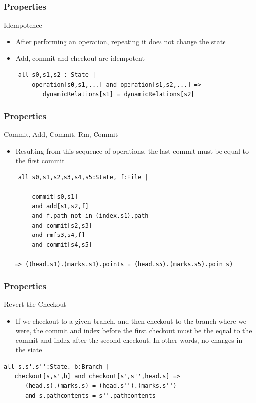 \documentclass{beamer}
\begin{document}
\begin{frame}[fragile]
   \frametitle{Properties}
   \begin{block}{Idempotence}
      \begin{itemize}
         \item After performing an operation, repeating it does not change the state
         \item Add, commit and checkout are idempotent
      \end{itemize}
   \end{block}
   \scriptsize
   \begin{lstlisting}
	all s0,s1,s2 : State | 
		operation[s0,s1,...] and operation[s1,s2,...] => 
		   dynamicRelations[s1] = dynamicRelations[s2]
   \end{lstlisting}
\end{frame}

\begin{frame}[fragile]
	\frametitle{Properties}
	\begin{block}{Commit, Add, Commit, Rm, Commit}
	\begin{itemize}
		\item Resulting from this sequence of operations, the last
		commit must be equal to the first commit
	\end{itemize}
	\end{block}
	\scriptsize
	\begin{lstlisting}
	all s0,s1,s2,s3,s4,s5:State, f:File | 
  
        commit[s0,s1] 
        and add[s1,s2,f] 
        and f.path not in (index.s1).path 
        and commit[s2,s3] 
        and rm[s3,s4,f] 
        and commit[s4,s5]
	
   => ((head.s1).(marks.s1).points = (head.s5).(marks.s5).points)
	\end{lstlisting}
	\normalsize
\end{frame}

\begin{frame}[fragile]
	\frametitle{Properties}
	\begin{block}{Revert the Checkout}
	\begin{itemize}
		\item If we checkout to a given branch, and then checkout to the
		branch where we were, the commit and index before the first checkout must
		be the equal to the commit and index after the second checkout. In other
		words, no changes in the state
	\end{itemize}
	\end{block}
	\scriptsize
	\begin{lstlisting}
all s,s',s'':State, b:Branch | 
   checkout[s,s',b] and checkout[s',s'',head.s] => 
      (head.s).(marks.s) = (head.s'').(marks.s'') 
      and s.pathcontents = s''.pathcontents
	\end{lstlisting}
	\normalsize
\end{frame}
\end{document}
